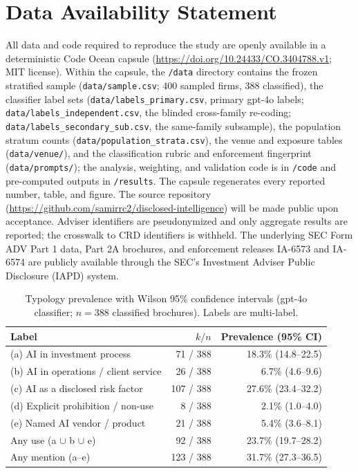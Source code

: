 \documentclass[utf8]{FrontiersinHarvard}
\begin{document}
\section*{Data Availability Statement}
All data and code required to reproduce the study are openly available in a deterministic Code Ocean capsule \citep{capsule2026} (\url{https://doi.org/10.24433/CO.3404788.v1}; MIT license). Within the capsule, the \texttt{/data} directory contains the frozen stratified sample (\texttt{data/sample.csv}; 400 sampled firms, 388 classified), the classifier label sets (\texttt{data/labels\_primary.csv}, primary gpt-4o labels; \texttt{data/labels\_independent.csv}, the blinded cross-family re-coding; \texttt{data/labels\_secondary\_sub.csv}, the same-family subsample), the population stratum counts (\texttt{data/population\_strata.csv}), the venue and exposure tables (\texttt{data/venue/}), and the classification rubric and enforcement fingerprint (\texttt{data/prompts/}); the analysis, weighting, and validation code is in \texttt{/code} and pre-computed outputs in \texttt{/results}. The capsule regenerates every reported number, table, and figure. The source repository (\url{https://github.com/samirrc2/disclosed-intelligence}) will be made public upon acceptance. Adviser identifiers are pseudonymized and only aggregate results are reported; the crosswalk to CRD identifiers is withheld. The underlying SEC Form ADV Part 1 data, Part 2A brochures, and enforcement releases IA-6573 and IA-6574 are publicly available through the SEC's Investment Adviser Public Disclosure (IAPD) system.





\begin{table}[h!]
\caption{Typology prevalence with Wilson 95\% confidence intervals (gpt-4o classifier; $n = 388$ classified brochures). Labels are multi-label.}
\label{tab:typology}
\centering
\begin{tabular}{lrr}
\toprule
Label & $k / n$ & Prevalence (95\% CI) \\
\midrule
(a) AI in investment process & 71 / 388 & 18.3\% (14.8--22.5) \\
(b) AI in operations / client service & 26 / 388 & 6.7\% (4.6--9.6) \\
(c) AI as a disclosed risk factor & 107 / 388 & 27.6\% (23.4--32.2) \\
(d) Explicit prohibition / non-use & 8 / 388 & 2.1\% (1.0--4.0) \\
(e) Named AI vendor / product & 21 / 388 & 5.4\% (3.6--8.1) \\
Any use (a $\cup$ b $\cup$ e) & 92 / 388 & 23.7\% (19.7--28.2) \\
Any mention (a--e) & 123 / 388 & 31.7\% (27.3--36.5) \\
\bottomrule
\end{tabular}
\end{table}
\end{document}
